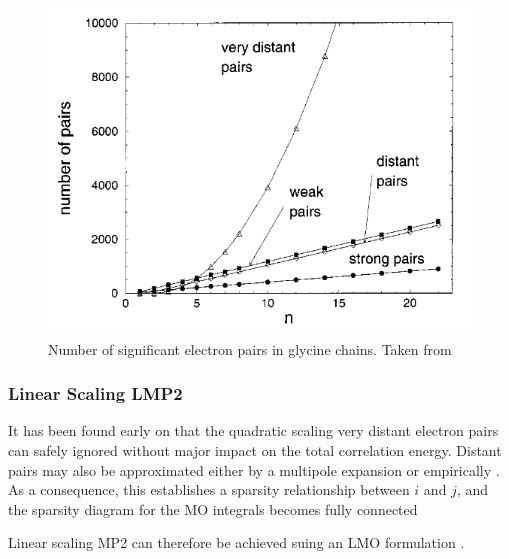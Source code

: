 \begin{figure}
\centering
\includegraphics[scale=0.5]{Pics/electron_pairs.png}
\caption[Number of significant electron pairs in glycine chains.]{Number of significant electron pairs in glycine chains. Taken from \cite{Sch1999}}
\end{figure}

\subsubsection{Linear Scaling LMP2}

It has been found \cite{Sae1987} early on that the quadratic scaling very distant electron pairs can safely ignored without major impact on the total correlation energy. Distant pairs may also be approximated either by a multipole expansion \cite{Het1998} or empirically \cite{Rau1995}. As a consequence, this establishes a sparsity relationship between $i$ and $j$, and the sparsity diagram for the MO integrals becomes fully connected
\begin{center}
\end{center}
\noindent Linear scaling MP2 can therefore be achieved suing an LMO formulation \cite{Sch1999}.

